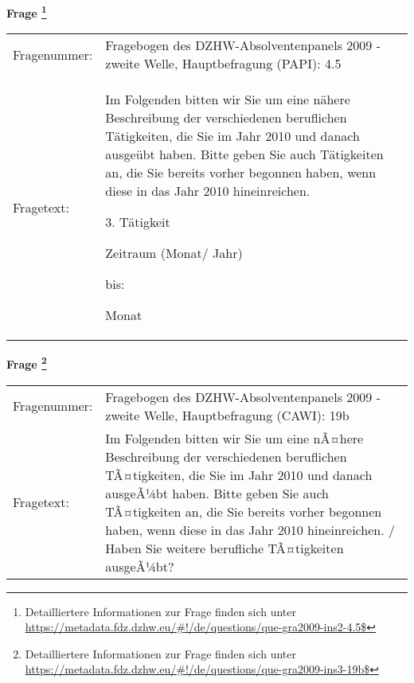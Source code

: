 				\vspace*{0.5cm}
                \noindent\textbf{Frage
	                \footnote{Detailliertere Informationen zur Frage finden sich unter
		              \url{https://metadata.fdz.dzhw.eu/\#!/de/questions/que-gra2009-ins2-4.5$}}}\\
				\begin{tabularx}{\hsize}{@{}lX}
					Fragenummer: &
					  Fragebogen des DZHW-Absolventenpanels 2009 - zweite Welle, Hauptbefragung (PAPI):
					  4.5
 \\
					Fragetext: & Im Folgenden bitten wir Sie um eine nähere Beschreibung der verschiedenen beruflichen Tätigkeiten, die Sie im Jahr 2010 und danach ausgeübt haben. Bitte geben Sie auch Tätigkeiten an, die Sie bereits vorher begonnen haben, wenn diese in das Jahr 2010 hineinreichen.\par  3. Tätigkeit\par  Zeitraum (Monat/ Jahr)\par  bis:\par  Monat \\
				\end{tabularx}
				\vspace*{0.5cm}
                \noindent\textbf{Frage
	                \footnote{Detailliertere Informationen zur Frage finden sich unter
		              \url{https://metadata.fdz.dzhw.eu/\#!/de/questions/que-gra2009-ins3-19b$}}}\\
				\begin{tabularx}{\hsize}{@{}lX}
					Fragenummer: &
					  Fragebogen des DZHW-Absolventenpanels 2009 - zweite Welle, Hauptbefragung (CAWI):
					  19b
 \\
					Fragetext: & Im Folgenden bitten wir Sie um eine nÃ¤here Beschreibung der verschiedenen beruflichen TÃ¤tigkeiten, die Sie im Jahr 2010 und danach ausgeÃ¼bt haben. Bitte geben Sie auch TÃ¤tigkeiten an, die Sie bereits vorher begonnen haben, wenn diese in das Jahr 2010 hineinreichen. / Haben Sie weitere berufliche TÃ¤tigkeiten ausgeÃ¼bt? \\
				\end{tabularx}





